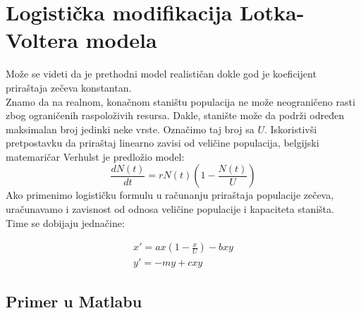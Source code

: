 \documentclass[a4paper]{article}
\begin{document}
\section{Logistička modifikacija Lotka-Voltera modela}
\label{sec:log_mod}
Može se videti da je prethodni model realističan dokle god je koeficijent priraštaja zečeva konstantan.\\
Znamo da na realnom, konačnom staništu populacija ne može neograničeno rasti zbog
ograničenih raspoloživih resursa. Dakle, stanište može da podrži određen maksimalan broj
jedinki neke vrste. Označimo taj broj sa $U$. Iskoristivši pretpostavku
da priraštaj linearno zavisi od veličine populacija, belgijski matemaričar Verhulst je predložio model:
	\begin{equation}
		\frac{dN(t)}{dt}=rN (t) (1 - \frac{N (t)}{U})
	\end{equation}
Ako primenimo logističku formulu u računanju priraštaja populacije zečeva, uračunavamo i zavisnost
od odnosa veličine populacije i kapaciteta staništa.\\
Time se dobijaju jednačine:

    \begin{equation}
        \label{eq:log_mod}
        \begin{aligned}
            x' = ax(1 - \frac{x}{U}) - bxy\\
            y' = -my + cxy
        \end{aligned}
	\end{equation}

\subsection{Primer u Matlabu}
\label{sub:log_mod_matlab}


\end{document}
